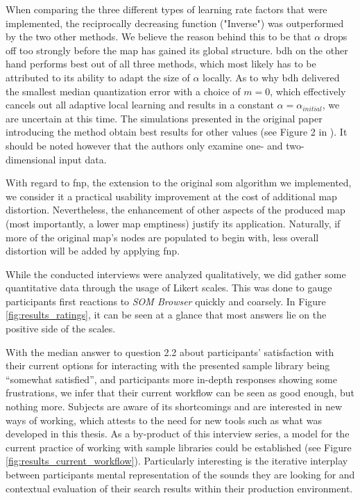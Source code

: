 When comparing the three different types of learning rate factors that were
implemented, the reciprocally decreasing function ("Inverse") was outperformed
by the two other methods. We believe the reason behind this to be that $\alpha$
drops off too strongly before the map has gained its global structure. \gls{bdh} on
the other hand performs best out of all three methods, which most likely has to
be attributed to its ability to adapt the size of $\alpha$ locally. As to why
\gls{bdh} delivered the smallest median quantization error with a choice of $m = 0$,
which effectively cancels out all adaptive local learning and results in a
constant $\alpha = \alpha_{initial}$, we are uncertain at this time.
The simulations presented in the original paper introducing the method obtain
best results for other values (see Figure 2 in \citep[p.18]{bauer1996}).
It should be noted however that the authors only examine one- and two-
dimensional input data.

\smallskip

With regard to \gls{fnp}, the extension to the original \gls{som} algorithm we
implemented, we consider it a practical usability improvement at the cost of
additional map distortion. Nevertheless, the enhancement of other aspects of the
produced map (most importantly, a lower map emptiness) justify its application.
Naturally, if more of the original map's nodes are populated to begin with, less
overall distortion will be added by applying \gls{fnp}.

\bigskip

While the conducted interviews were analyzed qualitatively, we did gather some
quantitative data through the usage of Likert scales. This was done to gauge
participants first reactions to \textit{SOM Browser} quickly and coarsely.
In Figure \ref{fig:results_ratings}, it can be seen at a glance that most
answers lie on the positive side of the scales.

\smallskip

With the median answer to question 2.2 about participants' satisfaction with
their current options for interacting with the presented sample library being
``somewhat satisfied'', and participants more in-depth responses showing some
frustrations, we infer that their current workflow can be seen as good enough,
but nothing more. Subjects are aware of its shortcomings and are interested in
new ways of working, which attests to the need for new tools such as what was
developed in this thesis. As a by-product of this interview series, a model for
the current practice of working with sample libraries could be established (see
Figure \ref{fig:results_current_workflow}). Particularly interesting is the
iterative interplay between participants mental representation of the sounds
they are looking for and contextual evaluation of their search results within
their production environment.


